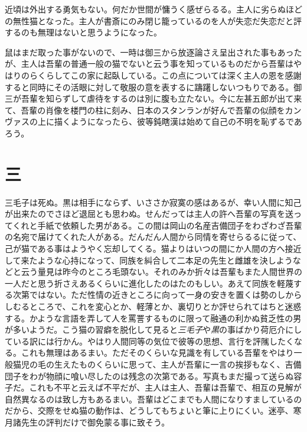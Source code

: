 \documentclass[12pt, openright]{book}
\begin{document}
近頃は外出する勇気もない。何だか世間が慵うく感ぜらるる。主人に劣らぬほどの無性猫となった。主人が書斎にのみ閉じ籠っているのを人が失恋だ失恋だと評するのも無理はないと思うようになった。

鼠はまだ取った事がないので、一時は御三から放逐論さえ呈出された事もあったが、主人は吾輩の普通一般の猫でないと云う事を知っているものだから吾輩はやはりのらくらしてこの家に起臥している。この点については深く主人の恩を感謝すると同時にその活眼に対して敬服の意を表するに躊躇しないつもりである。御三が吾輩を知らずして虐待をするのは別に腹も立たない。今に左甚五郎が出て来て、吾輩の肖像を楼門の柱に刻み、日本のスタンランが好んで吾輩の似顔をカンヴァスの上に描くようになったら、彼等鈍瞎漢は始めて自己の不明を恥ずるであろう。

\chapter*{\centering 三}
三毛子は死ぬ。黒は相手にならず、いささか寂寞の感はあるが、幸い人間に知己が出来たのでさほど退屈とも思わぬ。せんだっては主人の許へ吾輩の写真を送ってくれと手紙で依頼した男がある。この間は岡山の名産吉備団子をわざわざ吾輩の名宛で届けてくれた人がある。だんだん人間から同情を寄せらるるに従って、己が猫である事はようやく忘却してくる。猫よりはいつの間にか人間の方へ接近して来たような心持になって、同族を糾合して二本足の先生と雌雄を決しようなどと云う量見は昨今のところ毛頭ない。それのみか折々は吾輩もまた人間世界の一人だと思う折さえあるくらいに進化したのはたのもしい。あえて同族を軽蔑する次第ではない。ただ性情の近きところに向って一身の安きを置くは勢のしからしむるところで、これを変心とか、軽薄とか、裏切りとか評せられてはちと迷惑する。かような言語を弄して人を罵詈するものに限って融通の利かぬ貧乏性の男が多いようだ。こう猫の習癖を脱化して見ると\emph{三毛子}や\emph{黒}の事ばかり荷厄介にしている訳には行かん。やはり人間同等の気位で彼等の思想、言行を評隲したくなる。これも無理はあるまい。ただそのくらいな見識を有している吾輩をやはり一般猫児の毛の生えたものくらいに思って、主人が吾輩に一言の挨拶もなく、吉備団子をわが物顔に喰い尽したのは残念の次第である。写真もまだ撮って送らぬ容子だ。これも不平と云えば不平だが、主人は主人、吾輩は吾輩で、相互の見解が自然異なるのは致し方もあるまい。吾輩はどこまでも人間になりすましているのだから、交際をせぬ猫の動作は、どうしてもちょいと筆に上りにくい。迷亭、寒月諸先生の評判だけで御免蒙る事に致そう。
\end{document}

